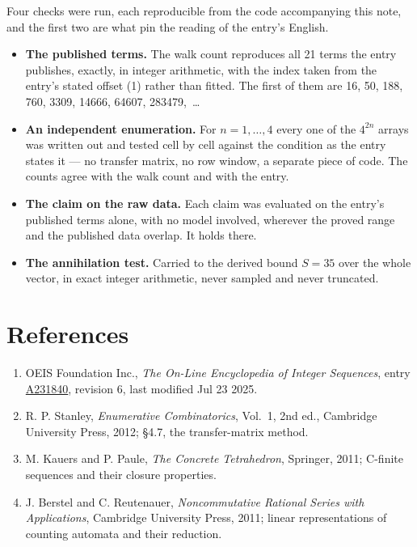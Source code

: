 \documentclass[11pt]{article}
\theoremstyle{definition}
\begin{document}
Four checks were run, each reproducible from the code accompanying this note, and the first two are what pin the reading of the entry's English.

\begin{itemize}

\item {\bfseries The published terms.} The walk count reproduces all 21 terms the entry publishes, exactly, in integer arithmetic, with the index taken from the entry's stated offset (1) rather than fitted. The first of them are 16, 50, 188, 760, 3309, 14666, 64607, 283479,~\dots

\item {\bfseries An independent enumeration.} For $n = 1,\dots,4$ every one of the $4^{2n}$ arrays was written out and tested cell by cell against the condition as the entry states it --- no transfer matrix, no row window, a separate piece of code. The counts agree with the walk count and with the entry.

\item {\bfseries The claim on the raw data.} Each claim was evaluated on the entry's published terms alone, with no model involved, wherever the proved range and the published data overlap. It holds there.

\item {\bfseries The annihilation test.} Carried to the derived bound $S = 35$ over the whole vector, in exact integer arithmetic, never sampled and never truncated.

\end{itemize}

\section{References}

\begin{enumerate}

\item OEIS Foundation Inc., \emph{The On-Line Encyclopedia of Integer Sequences}, entry \href{https://oeis.org/A231840}{A231840}, revision 6, last modified Jul 23 2025.

\item R. P. Stanley, \emph{Enumerative Combinatorics}, Vol.~1, 2nd ed., Cambridge University Press, 2012; \S4.7, the transfer-matrix method.

\item M. Kauers and P. Paule, \emph{The Concrete Tetrahedron}, Springer, 2011; C-finite sequences and their closure properties.

\item J. Berstel and C. Reutenauer, \emph{Noncommutative Rational Series with Applications}, Cambridge University Press, 2011; linear representations of counting automata and their reduction.

\end{enumerate}
\end{document}
